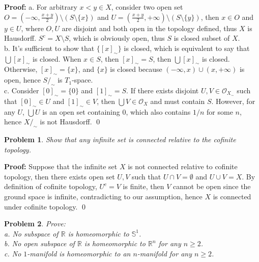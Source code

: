 \documentclass[12pt]{article}
\newtheorem{problem}{Problem}
\begin{document}
\textbf{Proof:} a. For arbitrary $x<y\in X$, consider two open set $O=(-\infty,\frac{x+y}{2})\setminus (S\setminus\{x\})$ and $U=(\frac{x+y}{2}, +\infty)\setminus (S\setminus\{y\})$, then $x\in O$ and $y\in U$, where $O,U$ are disjoint and both open in the topology defined, thus $X$ is Hausdorff. $S^c=X\setminus S$, which is obviously open, thus $S$ is closed subset of $X$. \\
\indent b. It's sufficient to show that $\{[x]_\sim\}$ is closed, which is equivalent to say that $\bigcup [x]_\sim$ is closed. When $x\in S$, then $[x]_\sim=S$, then $\bigcup[x]_\sim$ is closed. Otherwise, $[x]_\sim = \{x\}$, and $\{x\}$ is closed because $(-\infty, x)\cup(x,+\infty)$ is open, hence $S/_\sim$ is $T_1$-space. \\
\indent c. Consider $[0]_\sim=\{0\}$ and $[1]_\sim=S$. If there exists disjoint $U,V\in \mathcal{O}_{X_\sim}$ such that $[0]_\sim\in U$ and $[1]_\sim\in V$, then $\bigcup V\in\mathcal{O}_{X}$ and must contain $S$. However, for any $U$, $\bigcup U$ is an open set containing $0$, which also contains $1/n$ for some $n$, hence $X/_\sim$ is not Hausdorff. \qed
\\
\begin{problem}
Show that any infinite set is connected relative to the cofinite topology.
\end{problem}

\textbf{Proof:} Suppose that the infinite set $X$ is not connected relative to cofinite topology, then there exists open set $U,V$ such that $U\cap V=\emptyset$ and $U\cup V=X$. By definition of cofinite topology, $U^c=V$ is finite, then $V$ cannot be open since the ground space is infinite, contradicting to our assumption, hence $X$ is connected under cofinite topology. \qed
\\
\begin{problem}
Prove: \\
\indent a. No subspace of $\mathbb{R}$ is homeomorphic to $\mathbb{S}^1$. \\
\indent b. No open subspace of $\mathbb{R}$ is homeomorphic to $\mathbb{R}^n$ for any $n\geq 2$. \\
\indent c. No $1$-manifold is homeomorphic to an $n$-manifold for any $n\geq 2$.
\end{problem}
\end{document}
